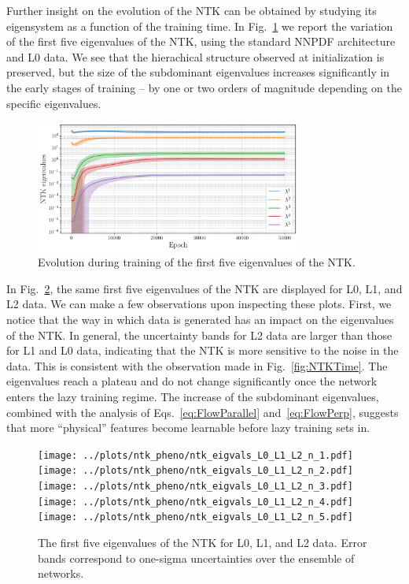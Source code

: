 Further insight on the evolution of the NTK can be obtained by studying its eigensystem as 
a function of the training time. 
In Fig.~\ref{fig:EigvalL0Training} we report the variation of the first five eigenvalues 
of the NTK, using the standard NNPDF architecture and L0 data. We see that the hierachical
structure observed at initialization is preserved, but the size of the subdominant eigenvalues
increases significantly in the early stages of training -- by one or two orders of magnitude depending on the 
specific eigenvalues. 
\begin{figure}[ht!]
  \centering  
  \includegraphics[width=0.78\textwidth]{plots/ntk_pheno/ntk_eigvals_single_plot_L0.pdf}  
  \caption{Evolution during training of the first five eigenvalues of the NTK.}
  \label{fig:EigvalL0Training}
\end{figure}
In Fig.~\ref{fig:EigvalsComparison}, the same first five eigenvalues of the NTK
are displayed for L0, L1, and L2 data. We can make a few observations upon
inspecting these plots. First, we notice that the way in which data is generated
has an impact on the eigenvalues of the NTK. In general, the uncertainty bands
for L2 data are larger than those for L1 and L0 data, indicating that the NTK is
more sensitive to the noise in the data. This is consistent with the observation
made in Fig.~\ref{fig:NTKTime}. 
The eigenvalues reach a plateau and do not change significantly once 
the network enters the lazy training regime. The increase of the subdominant eigenvalues, 
combined with the analysis of Eqs.~\eqref{eq:FlowParallel} and~\eqref{eq:FlowPerp}, 
suggests that more ``physical'' features become learnable before lazy training sets in. 

\begin{figure}[ht!]
  \centering
  \texttt{[image: ../plots/ntk\_pheno/ntk\_eigvals\_L0\_L1\_L2\_n\_1.pdf]}
  \texttt{[image: ../plots/ntk\_pheno/ntk\_eigvals\_L0\_L1\_L2\_n\_2.pdf]}
  \texttt{[image: ../plots/ntk\_pheno/ntk\_eigvals\_L0\_L1\_L2\_n\_3.pdf]}
  \texttt{[image: ../plots/ntk\_pheno/ntk\_eigvals\_L0\_L1\_L2\_n\_4.pdf]}
  \texttt{[image: ../plots/ntk\_pheno/ntk\_eigvals\_L0\_L1\_L2\_n\_5.pdf]}
  \vspace{0.5cm}
  \caption{The first five eigenvalues of the NTK for L0, L1, and L2 data. Error
  bands correspond to one-sigma uncertainties over the ensemble of networks.}
  \label{fig:EigvalsComparison}
\end{figure}

